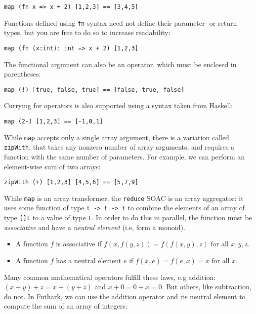 \documentclass[oneside,11pt]{book}
\begin{document}
\begin{lstlisting}
map (fn x => x + 2) [1,2,3] == [3,4,5]
\end{lstlisting}

Functions defined using \texttt{fn} syntax need not define their
parameter- or return types, but you are free to do so to increase
readability:

\begin{lstlisting}
map (fn (x:int): int => x + 2) [1,2,3]
\end{lstlisting}

The functional argument can also be an operator, which must be
enclosed in parentheses:

\begin{lstlisting}
map (!) [true, false, true] == [false, true, false]
\end{lstlisting}

Currying for operators is also supported using a syntax taken from
Haskell:

\begin{lstlisting}
map (2-) [1,2,3] == [-1,0,1]
\end{lstlisting}

While \texttt{map} accepts only a single array argument, there is a
variation called \texttt{zipWith}, that takes any nonzero number of
array arguments, and requires a function with the same number of
parameters.  For example, we can perform an element-wise sum of two
arrays:

\begin{lstlisting}
zipWith (+) [1,2,3] [4,5,6] == [5,7,9]
\end{lstlisting}

While \texttt{map} is an array transformer, the \texttt{reduce} SOAC
is an array aggregator: it uses some function of type \texttt{t -> t
  -> t} to combine the elements of an array of type \texttt{[]t} to a
value of type \texttt{t}.  In order to do this in parallel, the
function must be \textit{associative} and have a \textit{neutral
  element} (i.e, form a monoid).

\begin{itemize}
\item A function $f$ is associative if $f(x,f(y,z)) = f(f(x,y),z)$ for
  all $x,y,z$.
\item A function $f$ has a neutral element $e$ if
  $f(x,e) = f(e,x) = x$ for all $x$.
\end{itemize}

Many common mathematical operators fulfill these laws, e.g addition:
$(x+y)+z=x+(y+z)$ and $x+0=0+x=0$.  But others, like subtraction, do
not.  In Futhark, we can use the addition operator and its neutral
element to compute the sum of an array of integers:
\end{document}
